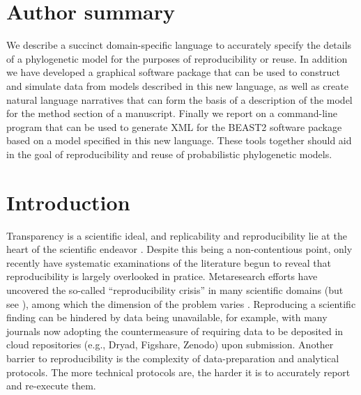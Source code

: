 \documentclass[10pt,letterpaper,table]{article}
\begin{document}
\section*{Author summary}
  We describe a succinct domain-specific language to accurately specify the details of a phylogenetic model for the purposes of reproducibility or reuse.
  In addition we have developed a graphical software package that can be used to construct and simulate data from models described in this new language, as well as create natural language narratives that can form the basis of a description of the model for the method section of a manuscript.
  Finally we report on a command-line program that can be used to generate XML for the BEAST2 software package based on a model specified in this new language.
  These tools together should aid in the goal of reproducibility and reuse of probabilistic phylogenetic models.


\linenumbers

\section*{Introduction}

Transparency is a scientific ideal, and replicability and
reproducibility lie at the heart of the scientific endeavor
\cite{nas19,munafo17}.
Despite this being a non-contentious point, only recently have
systematic examinations of the literature begun to reveal that
reproducibility is largely overlooked in pratice.
Metaresearch efforts have uncovered the so-called ``reproducibility
crisis'' \cite{baker16} in many scientific domains (but see
\cite{fanelli18}), among which the dimension of the problem varies
\cite{openscience15,camerer16}.
Reproducing a scientific finding can be hindered by data being
unavailable, for example, with many journals now adopting the
countermeasure of requiring data to be deposited in cloud 
repositories (e.g., Dryad, Figshare, Zenodo) upon
submission.
Another barrier to reproducibility is the complexity of
data-preparation and analytical protocols. 
The more technical protocols are, the harder it is to accurately
report and re-execute them.
\end{document}
